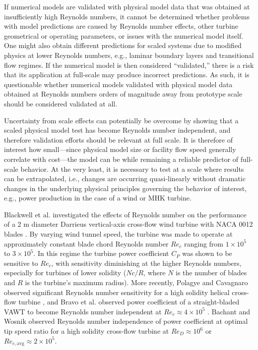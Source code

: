 \documentclass[energies,article,accept,moreauthors,pdftex,12pt,a4paper]{mdpi}
\begin{document}
If numerical models are validated with physical model data that was obtained at
insufficiently high Reynolds numbers, it cannot be determined whether problems
with model predictions are caused by Reynolds number effects, other turbine
geometrical or operating parameters, or issues with the numerical model itself.
One might also obtain different predictions for scaled systems due to modified
physics at lower Reynolds numbers, e.g., laminar boundary layers and
transitional flow regimes. If the numerical model is then considered
``validated,'' there is a risk that its application at full-scale may produce
incorrect predictions. As such, it is questionable whether numerical models
validated with physical model data obtained at Reynolds numbers orders of
magnitude away from prototype scale should be considered validated at all.

Uncertainty from scale effects can potentially be overcome by showing that a
scaled physical model test has become Reynolds number independent, and therefore
validation efforts should be relevant at full scale. It is therefore of interest
how small---since physical model size or facility flow speed generally correlate
with cost---the model can be while remaining a reliable predictor of full-scale
behavior. At the very least, it is necessary to test at a scale where results
can be extrapolated, i.e., changes are occurring quasi-linearly without dramatic
changes in the underlying physical principles governing the behavior of
interest, e.g., power production in the case of a wind or MHK turbine.

Blackwell et al. investigated the effects of Reynolds number on the performance
of a 2 m diameter Darrieus vertical-axis cross-flow wind turbine with NACA 0012
blades \cite{Blackwell1976}. By varying wind tunnel speed, the turbine was made
to operate at approximately constant blade chord Reynolds number $Re_c$ ranging
from $1 \times 10^5$ to $3 \times 10^5$. In this regime the turbine power
coefficient $C_P$ was shown to be sensitive to $Re_c$, with sensitivity
diminishing at the higher Reynolds numbers, especially for turbines of lower
solidity ($Nc/R$, where $N$ is the number of blades and $R$ is the turbine's
maximum radius). More recently, Polagye and Cavagnaro observed significant
Reynolds number sensitivity for a high solidity helical cross-flow turbine
\cite{Polagye2013b}, and Bravo et al. observed power coefficient of a
straight-bladed VAWT to become Reynolds number independent at $Re_c \approx 4
\times 10^5$ \cite{Bravo2007}. Bachant and Wosnik \cite{Bachant2014} observed
Reynolds number independence of power coefficient at optimal tip speed ratio for
a high solidity cross-flow turbine at $Re_D \approx 10^6$ or
$Re_{c,\mathrm{avg}} \approx 2 \times 10^5$.
\end{document}
